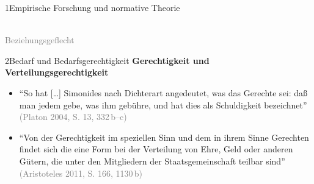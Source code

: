 \documentclass[xcolor=table,9pt,aspectratio=169]{beamer}
\begin{document}
\begin{frame}{\vspace*{10mm}1\hspace*{1em}Empirische Forschung und normative Theorie}
\begin{center}
   \\
   \textcolor{gray}{Beziehungsgeflecht}
\end{center}
\end{frame}


\begin{frame}{\vspace*{10mm}2\hspace*{1em}Bedarf und Bedarfsgerechtigkeit}
\textbf{Gerechtigkeit und Verteilungsgerechtigkeit}\\
\medskip
\begin{itemize}
   \item \enquote{So hat [\ldots] Simonides nach Dichterart angedeutet, was das Gerechte sei: daß man jedem gebe, was ihm gebühre, und hat dies als Schuldigkeit bezeichnet} \textcolor{gray}{(Platon 2004, S. 13, 332\,b--c)}
   \item \enquote{Von der Gerechtigkeit im speziellen Sinn und dem in ihrem Sinne Gerechten findet sich die eine Form bei der Verteilung von Ehre, Geld oder anderen Gütern, die unter den Mitgliedern der Staatsgemeinschaft teilbar sind} \textcolor{gray}{(Aristoteles 2011, S. 166, 1130\,b)}
\end{itemize}
\end{frame}
\end{document}
